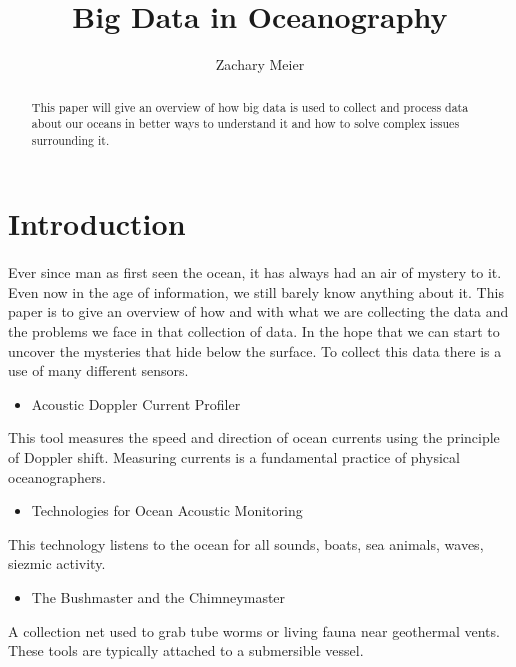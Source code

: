 \documentclass[sigconf]{acmart}
\begin{document}
\title{Big Data in Oceanography}
\author{Zachary Meier}
\renewcommand{\shortauthors}{Z. Meier et al.}
\begin{abstract}
This paper will give an overview of how big data is used to collect and process data about our oceans in better ways to understand it and how to solve complex issues surrounding it.
 
\end{abstract}
\maketitle
\section{Introduction}

\paragraph{}
Ever since man as first seen the ocean, it has always had an air of mystery to it.  Even now in the age of information, we still barely know anything about it.  This paper is to give an overview of how and with what we are collecting the data and the problems we face in that collection of data.  In the hope that we can start to uncover the mysteries that hide below the surface. To collect this data there is a use of many different sensors.  \cite{NOAA}
\begin{itemize}
\item Acoustic Doppler Current Profiler
\end{itemize}
This tool measures the speed and direction of ocean currents using the principle of Doppler shift. Measuring currents is a fundamental practice of physical oceanographers. 

\begin{itemize}
\item Technologies for Ocean Acoustic Monitoring
\end{itemize} 
This technology listens to the ocean for all sounds, boats, sea animals, waves, siezmic activity. 

\begin{itemize}
\item The Bushmaster and the Chimneymaster
\end{itemize}
A collection net used to grab tube worms or living fauna near geothermal vents.  These tools are typically attached to a submersible vessel.
\end{document}
